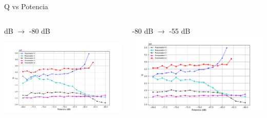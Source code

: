 \documentclass[ignorenonframetext,12pt]{beamer}
\begin{document}
\begin{frame}{Q vs Potencia}
				\begin{columns}
								\begin{column}{0.49\textwidth}
												\qquad {} dB $\to$ -80 dB

												\centering
												\includegraphics[height=0.50\textheight,width=1.1\textwidth]{Q_vs_P_tot_des}
								\end{column}
								\begin{column}{0.49\textwidth}
												-80 dB $\to$ -55 dB
												\centering
												\includegraphics[height=0.50\textheight,width=1.1\textwidth]{Q_vs_P_tot_asc}
								\end{column}
				\end{columns}

\end{frame}
\end{document}
